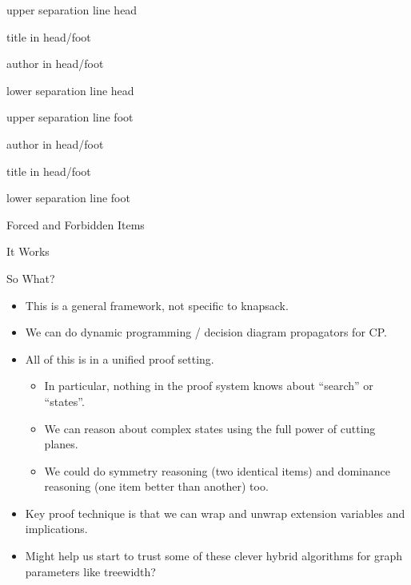 \documentclass[aspectratio=169,compress,10pt]{beamer}
\makeatletter
\newenvironment{nearlyplainframe}[2][]{
    \def\beamer@entrycode{\vspace*{-\headheight}\vspace*{3pt}}
    \setbeamertemplate{headline}
    {%
        \begin{beamercolorbox}[colsep=1.5pt]{upper separation line head}
        \end{beamercolorbox}
        \begin{beamercolorbox}[ht=0.5ex,dp=0.125ex,%
            leftskip=.3cm,rightskip=.3cm plus1fil]{title in head/foot}%
        \end{beamercolorbox}%
        \begin{beamercolorbox}[ht=0.5ex,dp=0.125ex,%
            leftskip=.3cm,rightskip=.3cm plus1fil]{author in head/foot}%
        \end{beamercolorbox}%
        \begin{beamercolorbox}[colsep=1.5pt]{lower separation line head}
        \end{beamercolorbox}
        \vspace*{\headheight}
    }

    \setbeamertemplate{footline}
    {%
        \begin{beamercolorbox}[colsep=1.5pt]{upper separation line foot}
        \end{beamercolorbox}
        \begin{beamercolorbox}[ht=0.5ex,dp=0.125ex,%
            leftskip=.3cm,rightskip=.3cm plus1fil]{author in head/foot}%
        \end{beamercolorbox}%
        \begin{beamercolorbox}[ht=0.5ex,dp=0.125ex,%
            leftskip=.3cm,rightskip=.3cm plus1fil]{title in head/foot}%
        \end{beamercolorbox}%
        \begin{beamercolorbox}[colsep=1.5pt]{lower separation line foot}
        \end{beamercolorbox}
    }

    \begin{frame}[#1]{#2}
    }{
    \end{frame}
}
\makeatother
\begin{document}
\begin{nearlyplainframe}[t]{Forced and Forbidden Items}
\end{nearlyplainframe}

\begin{frame}{It Works}
\end{frame}

\begin{frame}{So What?}
    \begin{itemize}
        \item This is a general framework, not specific to knapsack.
        \item We can do dynamic programming / decision diagram propagators for CP.
        \item All of this is in a unified proof setting.
            \begin{itemize}
                \item In particular, nothing in the proof system knows about ``search'' or
                    ``states''.
                \item We can reason about complex states using the full power of cutting
                    planes.
                \item We could do symmetry reasoning (two identical items) and dominance reasoning
                    (one item better than another) too.
            \end{itemize}
        \item Key proof technique is that we can wrap and unwrap extension variables and implications.
        \item Might help us start to trust some of these clever hybrid algorithms
            for graph parameters like treewidth?
    \end{itemize}
\end{frame}
\end{document}

